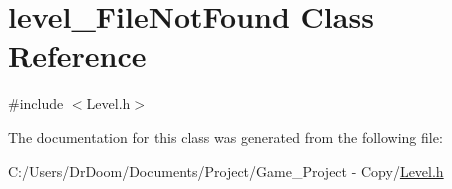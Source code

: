 \hypertarget{classlevel___file_not_found}{}\section{level\+\_\+\+File\+Not\+Found Class Reference}
\label{classlevel___file_not_found}


{\ttfamily \#include $<$Level.\+h$>$}



The documentation for this class was generated from the following file\+:\begin{DoxyCompactItemize}
\item 
C\+:/\+Users/\+Dr\+Doom/\+Documents/\+Project/\+Game\+\_\+\+Project -\/ Copy/\hyperlink{_level_8h}{Level.\+h}\end{DoxyCompactItemize}
